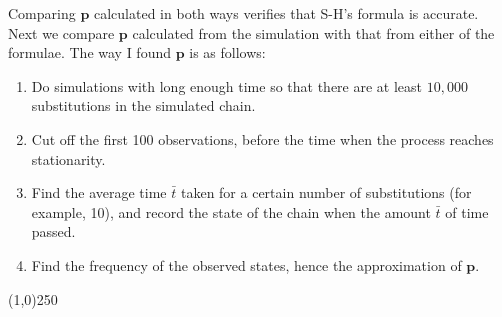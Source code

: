 \documentclass[13pt]{article}
\begin{document}
Comparing $\mathbf{p}$ calculated in both ways verifies that S-H's formula is accurate. Next we compare $\mathbf{p}$ calculated from the simulation with that from either of the formulae. The way I found $\mathbf{p}$ is as follows:\\
\begin{enumerate}
\item Do simulations with long enough time so that there are at least $10,000$ substitutions in the simulated chain.
\item Cut off the first 100 observations, before the time when the process reaches stationarity.
\item Find the average time $\bar{t}$ taken for a certain number of substitutions (for example, 10), and record the state of the chain when the amount $\bar{t}$ of time passed.
\item Find the frequency of the observed states, hence the approximation of $\mathbf{p}$.
\end{enumerate}

\begin{center}
\line(1,0){250}
\end{center}
\end{document}
